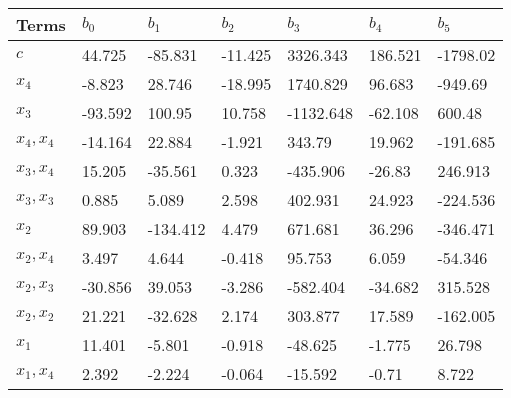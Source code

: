 \begin{tabular}{lllllll}
Terms & $b_0$ & $b_1$ & $b_2$ & $b_3$ & $b_4$ & $b_5$ \\ 
\hline 
$c$ & 44.725 & -85.831 & -11.425 & 3326.343 & 186.521 & -1798.02 \\ 
$x_4$ & -8.823 & 28.746 & -18.995 & 1740.829 & 96.683 & -949.69 \\ 
$x_3$ & -93.592 & 100.95 & 10.758 & -1132.648 & -62.108 & 600.48 \\ 
$x_4,x_4$ & -14.164 & 22.884 & -1.921 & 343.79 & 19.962 & -191.685 \\ 
$x_3,x_4$ & 15.205 & -35.561 & 0.323 & -435.906 & -26.83 & 246.913 \\ 
$x_3,x_3$ & 0.885 & 5.089 & 2.598 & 402.931 & 24.923 & -224.536 \\ 
$x_2$ & 89.903 & -134.412 & 4.479 & 671.681 & 36.296 & -346.471 \\ 
$x_2,x_4$ & 3.497 & 4.644 & -0.418 & 95.753 & 6.059 & -54.346 \\ 
$x_2,x_3$ & -30.856 & 39.053 & -3.286 & -582.404 & -34.682 & 315.528 \\ 
$x_2,x_2$ & 21.221 & -32.628 & 2.174 & 303.877 & 17.589 & -162.005 \\ 
$x_1$ & 11.401 & -5.801 & -0.918 & -48.625 & -1.775 & 26.798 \\ 
$x_1,x_4$ & 2.392 & -2.224 & -0.064 & -15.592 & -0.71 & 8.722 \\ 
\hline 
\end{tabular}